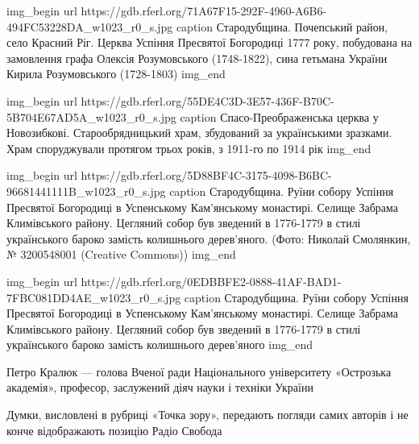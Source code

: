 \ifcmt
img_begin 
url https://gdb.rferl.org/71A67F15-292F-4960-A6B6-494FC53228DA_w1023_r0_s.jpg
caption Стародубщина. Почепський район, село Красний Ріг. Церква Успіння Пресвятої Богородиці 1777 року, побудована на замовлення графа Олексія Розумовського (1748-1822), сина гетьмана України Кирила Розумовського (1728-1803)
img_end
\fi

\ifcmt
img_begin 
url https://gdb.rferl.org/55DE4C3D-3E57-436F-B70C-5B704E67AD5A_w1023_r0_s.jpg
caption Спасо-Преображенська церква у Новозибкові. Старообрядницький храм, збудований за українськими зразками. Храм споруджували протягом трьох років, з 1911-го по 1914 рік
img_end
\fi

\ifcmt
img_begin 
	url https://gdb.rferl.org/5D88BF4C-3175-4098-B6BC-96681441111B_w1023_r0_s.jpg
	caption Стародубщина. Руїни собору Успіння Пресвятої Богородиці в Успенському Кам'янському монастирі. Селище Забрама Климівського району. Цегляний собор був зведений в 1776-1779 в стилі українського бароко замість колишнього дерев'яного. (Фото: Николай Смолянкин, № 3200548001 (Creative Commons))
img_end
\fi

\ifcmt
img_begin 
	url https://gdb.rferl.org/0EDBBFE2-0888-41AF-BAD1-7FBC081DD4AE_w1023_r0_s.jpg
	caption Стародубщина. Руїни собору Успіння Пресвятої Богородиці в Успенському Кам'янському монастирі. Селище Забрама Климівського району. Цегляний собор був зведений в 1776-1779 в стилі українського бароко замість колишнього дерев'яного
img_end
\fi

Петро Кралюк --- голова Вченої ради Національного університету «Острозька
академія», професор, заслужений діяч науки і техніки України

Думки, висловлені в рубриці «Точка зору», передають погляди самих авторів і не
конче відображають позицію Радіо Свобода

